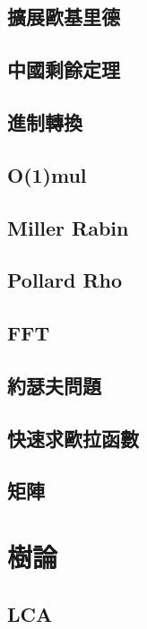 \documentclass[a4paper,10pt,twocolumn,oneside]{article}
\begin{document}
\subsection{擴展歐基里德}

\subsection{中國剩餘定理}

\subsection{進制轉換}

\subsection{O(1)mul}

\subsection{Miller Rabin}

\subsection{Pollard Rho}

\subsection{FFT}

\subsection{約瑟夫問題}

\subsection{快速求歐拉函數}

\subsection{矩陣}



\section{樹論}
\subsection{LCA}

\end{document}
